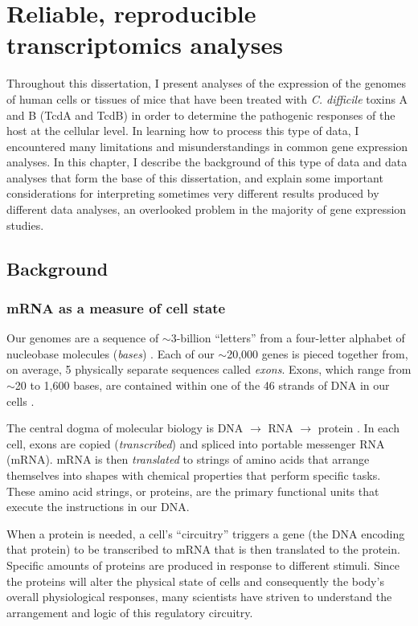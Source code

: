 
\chapter[Choosing transcriptomics analyses]{Reliable, reproducible 
           transcriptomics analyses}\label{chapter:introjtm}

Throughout this dissertation, I present analyses of the expression of the genomes
of human cells or tissues of mice that have been treated 
with \textit{C. difficile} toxins A and B
(TcdA and TcdB) in order to determine the pathogenic responses
of the host at the cellular level. 
In learning how to process this type of data,
I encountered many limitations and misunderstandings in 
common gene expression analyses. In this chapter, I describe
the background of this type of data and data analyses that form 
the base of this dissertation, and explain some important considerations
for interpreting sometimes very different results 
produced by different data analyses, an overlooked problem in the
majority of gene expression studies.

\section{Background}

\subsection{mRNA as a measure of cell state}

Our genomes are a sequence of $\sim$3-billion ``letters'' from a four-letter
alphabet of nucleobase molecules (\textit{bases}) \cite{Lander:2001wi}. 
Each of our $\sim$20,000 genes is pieced together from, on average,
5 physically separate sequences called \textit{exons}. Exons, which
range from $\sim$20 to 1,600 bases, are contained
within one of the 46 strands of DNA in our cells \cite{Michael:1999dm}.

The central dogma of molecular biology is 
DNA $\rightarrow$ RNA $\rightarrow$ protein \cite{Crick:1970wb}.
In each cell, exons are
copied (\textit{transcribed}) and spliced into portable
messenger RNA (mRNA). 
mRNA is then \textit{translated} to strings
of amino acids that arrange themselves into shapes with 
chemical properties that perform specific tasks.
These amino acid strings, or proteins, are the primary functional 
units that execute the instructions in our DNA.

When a protein is needed, a cell's ``circuitry'' 
triggers a gene (the DNA encoding that protein)
to be transcribed to mRNA that is then translated to the protein.
Specific amounts of proteins are produced
in response to different stimuli. Since the proteins will alter
the physical state of cells and consequently the body's overall physiological responses, 
many scientists have striven to understand the arrangement and logic
of this regulatory circuitry.

